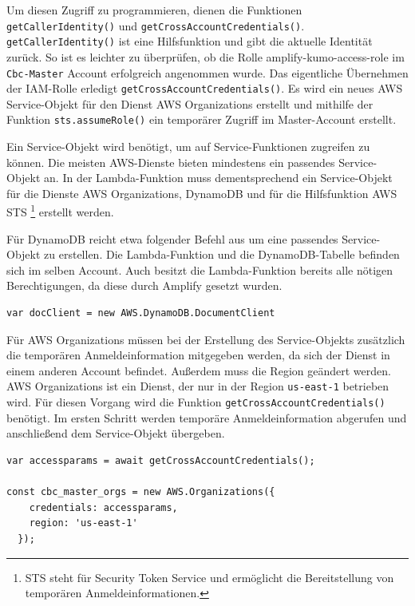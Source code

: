 Um diesen Zugriff zu programmieren, dienen die Funktionen \verb+getCallerIdentity()+ und \verb+getCrossAccountCredentials()+.
\verb+getCallerIdentity()+ ist eine Hilfsfunktion und gibt die aktuelle Identität zurück.
So ist es leichter zu überprüfen, ob die Rolle \grqq amplify-kumo-access-role\grqq{} im \verb+Cbc-Master+ Account erfolgreich angenommen wurde.
Das eigentliche Übernehmen der IAM-Rolle erledigt \verb+getCrossAccountCredentials()+.
Es wird ein neues AWS Service-Objekt für den Dienst AWS Organizations erstellt und mithilfe der Funktion \verb+sts.assumeRole()+ ein temporärer Zugriff im Master-Account erstellt.

Ein Service-Objekt wird benötigt, um auf Service-Funktionen zugreifen zu können.
Die meisten AWS-Dienste bieten mindestens ein passendes Service-Objekt an.
In der Lambda-Funktion muss dementsprechend ein Service-Objekt für die Dienste AWS Organizations, DynamoDB und für die Hilfsfunktion AWS STS \footnote{STS steht für Security Token Service und ermöglicht die Bereitstellung von temporären Anmeldeinformationen.} erstellt werden.
\cite[]{ServiceObject}

Für DynamoDB reicht etwa folgender Befehl aus um eine passendes Service-Objekt zu erstellen.
Die Lambda-Funktion und die DynamoDB-Tabelle befinden sich im selben Account.
Auch besitzt die Lambda-Funktion bereits alle nötigen Berechtigungen, da diese durch Amplify gesetzt wurden.
\\
\begin{lstlisting}[basicstyle=\ttfamily\small, breaklines=true , frame = single, backgroundcolor=\color{flashwhite} ]
var docClient = new AWS.DynamoDB.DocumentClient
\end{lstlisting}


Für AWS Organizations müssen bei der Erstellung des Service-Objekts zusätzlich die temporären Anmeldeinformation mitgegeben werden, da sich der Dienst in einem anderen Account befindet.
Außerdem muss die Region geändert werden.
AWS Organizations ist ein Dienst, der nur in der Region \verb+us-east-1+ betrieben wird.
Für diesen Vorgang wird die Funktion \verb+getCrossAccountCredentials()+ benötigt.
Im ersten Schritt werden temporäre Anmeldeinformation abgerufen und anschließend dem Service-Objekt übergeben.

\begin{lstlisting}[basicstyle=\ttfamily\small, breaklines=true , frame = single, backgroundcolor=\color{lightgray}, caption={Neues ServiceObject mit einer anderen Identität} ]
var accessparams = await getCrossAccountCredentials();

const cbc_master_orgs = new AWS.Organizations({
    credentials: accessparams,
    region: 'us-east-1'
  });
\end{lstlisting}


